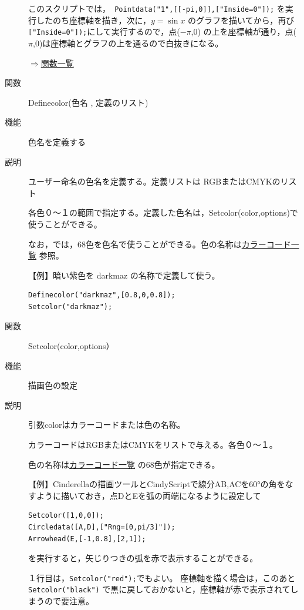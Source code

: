 \documentclass[papersize,a4paper,12pt,uplatex]{jsarticle}
\begin{document}
\begin{description}
このスクリプトでは，\verb| Pointdata("1",[[-pi,0]],["Inside=0"]);| を実行したのち座標軸を描き，次に，$y=\sin x$ のグラフを描いてから，再び \verb| ["Inside=0"]);|にして実行するので，点($-\pi$,0) の上を座標軸が通り，点($\pi$,0)は座標軸とグラフの上を通るので白抜きになる。

\begin{flushright}\hyperlink{functionlist}{$\Rightarrow$関数一覧}\end{flushright}

\vspace{\baselineskip}
\hypertarget{definecolor}{}
\item[関数]Definecolor(色名 , 定義のリスト)
\item[機能]色名を定義する
\item[説明]ユーザー命名の色名を定義する。定義リストは RGBまたはCMYKのリスト

各色０〜１の範囲で指定する。定義した色名は，Setcolor(color,options)で使うことができる。

なお，\ketcindy では，68色を色名で使うことができる。色の名称は\hyperlink{colorcodelist}{カラーコード一覧} 参照。

\vspace{\baselineskip}
【例】暗い紫色を darkmaz の名称で定義して使う。
\begin{verbatim}
Definecolor("darkmaz",[0.8,0,0.8]);
Setcolor("darkmaz");
\end{verbatim}


\vspace{\baselineskip}
\hypertarget{setcolor}{}
\item[関数]Setcolor(color,options）
\item[機能]描画色の設定
\item[説明]引数colorはカラーコードまたは色の名称。

カラーコードはRGBまたはCMYKをリストで与える。各色０〜１。

色の名称は\hyperlink{colorcodelist}{カラーコード一覧} の68色が指定できる。


\vspace{\baselineskip}
【例】Cinderellaの描画ツールとCindyScriptで線分AB,ACを60°の角をなすように描いておき，点DとEを弧の両端になるように設定して
\begin{verbatim}
Setcolor([1,0,0]);
Circledata([A,D],["Rng=[0,pi/3]"]);
Arrowhead(E,[-1,0.8],[2,1]);
\end{verbatim}
を実行すると，矢じりつきの弧を赤で表示することができる。

１行目は，\verb|Setcolor("red");|でもよい。
座標軸を描く場合は，このあと \verb|Setcolor("black")| で黒に戻しておかないと，座標軸が赤で表示されてしまうので要注意。



\end{description}
\end{document}
